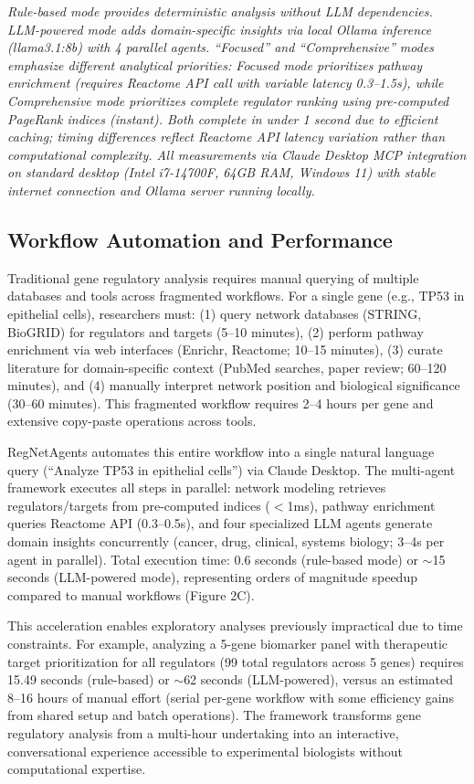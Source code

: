 \documentclass[11pt]{article}
\begin{document}
\textit{Rule-based mode provides deterministic analysis without LLM dependencies. LLM-powered mode adds domain-specific insights via local Ollama inference (llama3.1:8b) with 4 parallel agents. ``Focused'' and ``Comprehensive'' modes emphasize different analytical priorities: Focused mode prioritizes pathway enrichment (requires Reactome API call with variable latency 0.3--1.5s), while Comprehensive mode prioritizes complete regulator ranking using pre-computed PageRank indices (instant). Both complete in under 1 second due to efficient caching; timing differences reflect Reactome API latency variation rather than computational complexity. All measurements via Claude Desktop MCP integration on standard desktop (Intel i7-14700F, 64GB RAM, Windows 11) with stable internet connection and Ollama server running locally.}

\subsection{Workflow Automation and Performance}

Traditional gene regulatory analysis requires manual querying of multiple databases and tools across fragmented workflows. For a single gene (e.g., TP53 in epithelial cells), researchers must: (1) query network databases (STRING, BioGRID) for regulators and targets (5--10 minutes), (2) perform pathway enrichment via web interfaces (Enrichr, Reactome; 10--15 minutes), (3) curate literature for domain-specific context (PubMed searches, paper review; 60--120 minutes), and (4) manually interpret network position and biological significance (30--60 minutes). This fragmented workflow requires 2--4 hours per gene and extensive copy-paste operations across tools.

RegNetAgents automates this entire workflow into a single natural language query (``Analyze TP53 in epithelial cells'') via Claude Desktop. The multi-agent framework executes all steps in parallel: network modeling retrieves regulators/targets from pre-computed indices ($<$1ms), pathway enrichment queries Reactome API (0.3--0.5s), and four specialized LLM agents generate domain insights concurrently (cancer, drug, clinical, systems biology; 3--4s per agent in parallel). Total execution time: 0.6 seconds (rule-based mode) or $\sim$15 seconds (LLM-powered mode), representing orders of magnitude speedup compared to manual workflows (Figure 2C).

This acceleration enables exploratory analyses previously impractical due to time constraints. For example, analyzing a 5-gene biomarker panel with therapeutic target prioritization for all regulators (99 total regulators across 5 genes) requires 15.49 seconds (rule-based) or $\sim$62 seconds (LLM-powered), versus an estimated 8--16 hours of manual effort (serial per-gene workflow with some efficiency gains from shared setup and batch operations). The framework transforms gene regulatory analysis from a multi-hour undertaking into an interactive, conversational experience accessible to experimental biologists without computational expertise.
\end{document}
